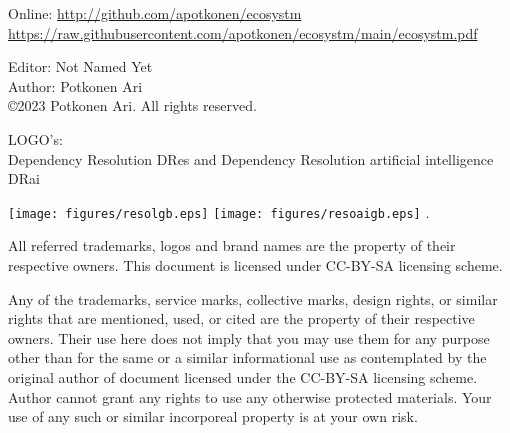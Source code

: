 %
%
%
\label{rights}
\vspace*{\fill}
Online: \url{http://github.com/apotkonen/ecosystm} \cite{Ecosystm}\\
{\scriptsize
\url{https://raw.githubusercontent.com/apotkonen/ecosystm/main/ecosystm.pdf}
}\vspace*{\fill}

Editor: Not Named Yet\\
Author: Potkonen Ari\\
\copyright 2023 Potkonen Ari. All rights reserved.
\vspace{\baselineskip}

LOGO's:\\
Dependency Resolution DRes\textsuperscript{\texttrademark}
and Dependency Resolution artificial intelligence
DRai\textsuperscript{\texttrademark}

\texttt{[image: figures/resolgb.eps]}
\texttt{[image: figures/resoaigb.eps]}
.
\vspace*{\fill}

All referred trademarks, logos and brand names are the property of their
respective owners. This document is licensed under CC-BY-SA licensing scheme.
\vspace{\baselineskip}

Any of the trademarks, service marks, collective marks, design rights, or
similar rights that are mentioned, used, or cited are the property of their
respective owners. Their use here does not imply that you may use them for any
purpose other than for the same or a similar informational use as contemplated
by the original author of document licensed under the CC-BY-SA licensing
scheme. Author cannot grant any rights to use any otherwise protected
materials. Your use of any such or similar incorporeal property is at your own
risk.


